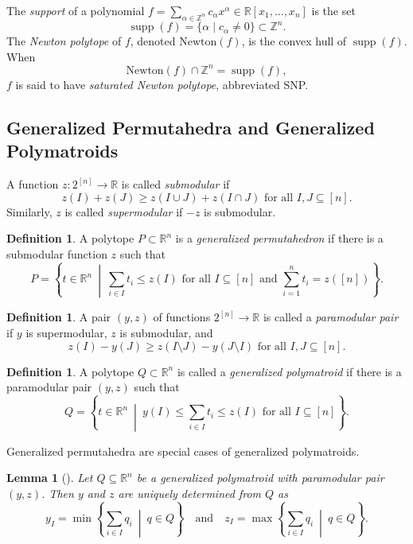 \documentclass{amsart}
\newtheorem{lemma}[theorem]{Lemma}
\theoremstyle{definition}
\newtheorem{definition}[theorem]{Definition}
\theoremstyle{named}
\DeclareMathOperator{\supp}{supp}
\begin{document}
	The \emph{support} of a polynomial $f=\sum_{\alpha\in \mathbb{Z}^n}c_\alpha x^{\alpha} \in \mathbb{R}[x_1,\ldots,x_n]$ is the set
	\[\supp(f)=\{\alpha \mid c_{\alpha} \neq 0\}\subset \mathbb{Z}^n. \]
	The \emph{Newton polytope} of $f$, denoted $\mathrm{Newton}(f)$, is the convex hull of $\supp(f)$. When \[\mathrm{Newton}(f)\cap \mathbb{Z}^n = \supp(f),\] 
	$f$ is said to have \emph{saturated Newton polytope}, abbreviated SNP.
	
	\subsection{Generalized Permutahedra and Generalized Polymatroids}
	
	A function $z:2^{[n]}\to \mathbb{R}$ is called \emph{submodular} if 
	\[z(I)+z(J)\geq z(I\cup J)+z(I\cap J) \mbox{ for all } I,J\subseteq [n]. \]
	Similarly, $z$ is called \emph{supermodular} if $-z$ is submodular.
	\begin{definition}
		A polytope $P\subset \mathbb{R}^n$ is a \emph{generalized permutahedron} if there is a submodular function $z$ such that 
		\[P=\left\{t\in \mathbb{R}^n \ \middle|\ \sum_{i\in I} t_i\leq z(I) \mbox{ for all } I\subseteq [n] \mbox{ and } \sum_{i=1}^n t_i= z([n]) \right\}. \]
	\end{definition}
	
	\begin{definition}
		A pair $(y,z)$ of functions $2^{[n]}\to \mathbb{R}$ is called a \emph{paramodular pair} if $y$ is supermodular, $z$ is submodular, and
		\[z(I)-y(J)\geq z(I\setminus J)-y(J\setminus I) \mbox{ for all } I,J\subseteq [n]. \]
	\end{definition}
	
	\begin{definition}
		\label{def:gpolymatroid}
		A polytope $Q\subset \mathbb{R}^n$ is called a \emph{generalized polymatroid} if there is a paramodular pair $(y,z)$ such that 
		\[Q=\left\{t\in \mathbb{R}^n \ \middle| \ y(I)\leq \sum_{i\in I} t_i\leq z(I) \mbox{ for all } I\subseteq [n]\right\}. \]
	\end{definition}

	Generalized permutahedra are special cases of generalized polymatroids.
	
	\begin{lemma}[{\cite[Theorem 14.2.8]{frank}}]
		\label{lem:recovery}
		Let $Q\subseteq \mathbb{R}^n$ be a generalized polymatroid with paramodular pair $(y,z)$. Then $y$ and $z$ are uniquely determined from $Q$ as
		\[y_I = \min\left\{\sum_{i\in I} q_{i} \ \middle| \ q\in Q\right\} \quad \mbox{and}\quad z_I = \max\left\{\sum_{i\in I} q_{i} \ \middle| \ q\in Q\right\}. \]
	\end{lemma}
	
\end{document}
